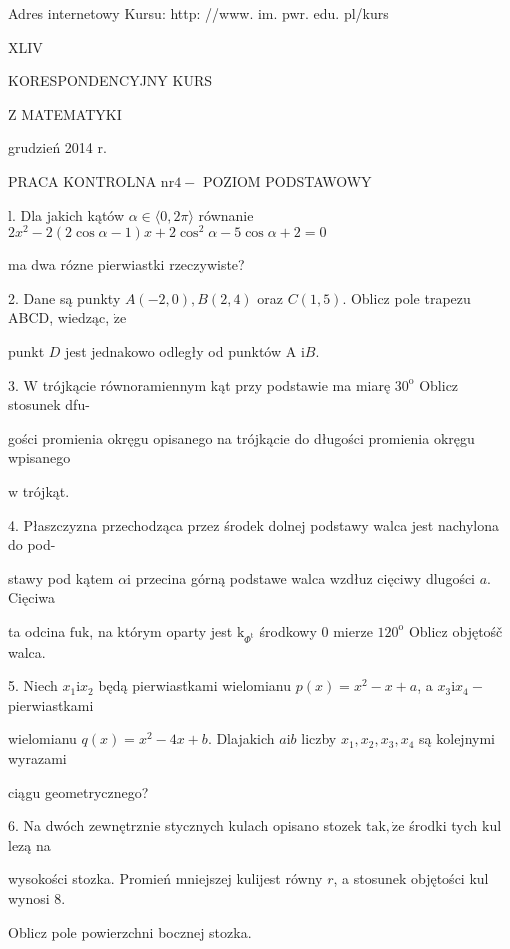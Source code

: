 \documentclass[a4paper,12pt]{article}
\begin{document}
Adres internetowy Kursu: http: //www. im. pwr. edu. pl/kurs







XLIV

KORESPONDENCYJNY KURS

Z MATEMATYKI

grudzień 2014 r.

PRACA KONTROLNA $\mathrm{n}\mathrm{r} 4-$ POZIOM PODSTAWOWY

l. Dla jakich kątów $\alpha\in\langle 0,  2\pi\rangle$ równanie $2x^{2}-2(2\cos\alpha-1)x+2\cos^{2}\alpha-5\cos\alpha+2=0$

ma dwa rózne pierwiastki rzeczywiste?

2. Dane są punkty $A(-2,0), B(2,4)$ oraz $C(1,5)$. Oblicz pole trapezu ABCD, wiedząc, $\dot{\mathrm{z}}\mathrm{e}$

punkt $D$ jest jednakowo odległy od punktów A $\mathrm{i}B.$

3. $\mathrm{W}$ trójkącie równoramiennym kąt przy podstawie ma miarę $30^{\mathrm{o}}$ Oblicz stosunek dfu-

gości promienia okręgu opisanego na trójkącie do długości promienia okręgu wpisanego

$\mathrm{w}$ trójkąt.

4. Płaszczyzna przechodząca przez środek dolnej podstawy walca jest nachylona do pod-

stawy pod kątem $\alpha \mathrm{i}$ przecina górną podstawe walca wzdłuz cięciwy dlugości $a$. Cięciwa

ta odcina $\mathrm{f}\mathrm{u}\mathrm{k}$, na którym oparty jest $\mathrm{k}_{\Phi^{\mathrm{t}}}$ środkowy $0$ mierze $120^{\mathrm{o}}$ Oblicz objętośč walca.

5. Niech $x_{1}\mathrm{i}x_{2}$ będą pierwiastkami wielomianu $p(x)=x^{2}-x+a$, a $x_{3}\mathrm{i}x_{4}-$ pierwiastkami

wielomianu $q(x)=x^{2}-4x+b$. Dlajakich $a\mathrm{i}b$ liczby $x_{1}, x_{2}, x_{3}, x_{4}$ są kolejnymi wyrazami

ciągu geometrycznego?

6. Na dwóch zewnętrznie stycznych kulach opisano stozek $\mathrm{t}\mathrm{a}\mathrm{k}, \dot{\mathrm{z}}\mathrm{e}$ środki tych kul lezą na

wysokości stozka. Promień mniejszej kulijest równy $r$, a stosunek objętości kul wynosi 8.

Oblicz pole powierzchni bocznej stozka.
\end{document}
